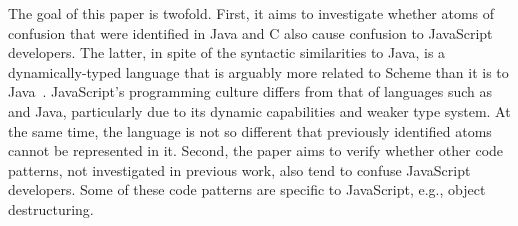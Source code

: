 The goal of this paper is twofold. First, it aims to investigate whether atoms of confusion that were identified in Java and C also cause confusion to JavaScript developers. The latter, in spite of the syntactic similarities to Java, is a dynamically-typed language that is arguably more related to Scheme than it is to Java~\cite{Eich:2018:BHJ}. 
JavaScript's programming culture differs from that of languages such as \clang and Java, particularly due to its dynamic capabilities and weaker type system. At the same time, the language is not so different that previously identified atoms cannot be represented in it. Second, the paper aims to verify whether other code patterns, not investigated in previous work, also tend to confuse JavaScript developers. Some of these code patterns are specific to JavaScript, e.g., object destructuring. 

